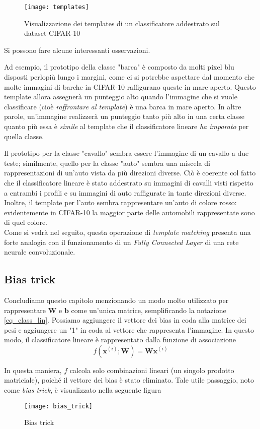 \begin{figure}[h]
\centering
\texttt{[image: templates]}
\caption{Visualizzazione dei templates di un classificatore addestrato sul dataset CIFAR-10}
\label{templates}
\end{figure}

Si possono fare alcune interessanti osservazioni.

Ad esempio, il prototipo della classe "barca" è composto da molti pixel blu disposti perlopiù lungo i margini, come ci si potrebbe aspettare dal momento che molte immagini di barche in CIFAR-10 raffigurano queste in mare aperto. Questo template allora assegnerà un punteggio alto quando l'immagine che si vuole classificare (cioè \textit{raffrontare al template}) è una barca in mare aperto. In altre parole, un'immagine realizzerà un punteggio tanto più alto in una certa classe quanto più essa è \textit{simile} al template che il classificatore lineare \textit{ha imparato} per quella classe.

Il prototipo per la classe "cavallo" sembra essere l'immagine di un cavallo a due teste; similmente, quello per la classe "auto" sembra una miscela di rappresentazioni di un'auto vista da più direzioni diverse. Ciò è coerente col fatto che il classificatore lineare è stato addestrato su immagini di cavalli visti rispetto a entrambi i profili e su immagini
di auto raffigurate in tante direzioni diverse. Inoltre, il template per l'auto sembra rappresentare un'auto di colore rosso: evidentemente in CIFAR-10 la maggior parte delle automobili rappresentate sono di quel colore.\\

Come si vedrà nel seguito, questa operazione di \textit{template matching} presenta una forte analogia con il funzionamento di un \textit{Fully Connected Layer} di una rete neurale convoluzionale.

\subsection*{Bias trick}
Concludiamo questo capitolo menzionando un modo molto utilizzato per rappresentare $\mathbf{W}$ e $\mathbf{b}$ come un'unica matrice, semplificando la notazione \ref{eq_class_lin}.
Possiamo aggiungere il vettore dei bias in coda alla matrice dei pesi e aggiungere un "1" in coda al vettore che rappresenta l'immagine. In questo modo, il classificatore lineare è rappresentato dalla funzione di associazione
\begin{equation} \label{eq_bias_trick}
f(\mathbf{x}^{(i)};\mathbf{W})=\mathbf{W}\mathbf{x}^{(i)}
\end{equation}

In questa maniera, $f$ calcola solo combinazioni lineari (un singolo prodotto matriciale), poiché il vettore dei bias è stato eliminato.
Tale utile passaggio, noto come \textit{bias trick}, è visualizzato nella seguente figura

\begin{figure}[h]
\centering
\texttt{[image: bias\_trick]}
\caption{Bias trick}
\label{bias_trick}
\end{figure}


